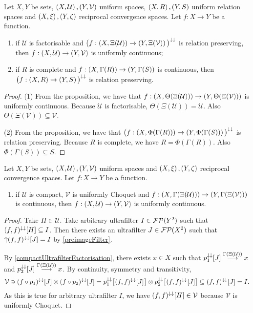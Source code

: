 \begin{corollary}
Let $X,Y$ be sets, $\left( X,\mathcal{U} \right), \left( Y,\mathcal{V} \right)$ uniform spaces, $\left( X,R \right), \left( Y,S \right)$ uniform relation spaces and $\left( X,\xi \right), \left( Y,\zeta \right)$ reciprocal convergence spaces. Let $f: X\to Y$ be a function.
\begin{enumerate}
\item if $\mathcal{U}$ is factorisable and $\big(f: \left( X,\Xi(\mathcal{U}) \right) \to \left( Y,\Xi(\mathcal{V}) \right)\big)^{\downarrow\downarrow}$ is relation preserving, then $f: \left( X,\mathcal{U} \right) \to \left( Y,\mathcal{V} \right)$ is uniformly continuous;
\item if $R$ is complete and $f: \left( X,\Gamma(R) \right) \to \left( Y,\Gamma(S) \right)$ is continuous, then $\big(f: \left( X,R \right) \to \left( Y,S \right)\big)^{\downarrow\downarrow}$ is relation preserving.
\end{enumerate}
\end{corollary}
\begin{proof}
(1) From the proposition, we have that $f: \left( X,\Theta(\Xi(\mathcal{U})) \right) \to \left( Y,\Theta(\Xi(\mathcal{V})) \right)$ is uniformly continuous. Because $\mathcal{U}$ is factorisable, $\Theta(\Xi(\mathcal{U})) = \mathcal{U}$. Also $\Theta(\Xi(\mathcal{V})) \subseteq \mathcal{V}$.

(2) From the proposition, we have that $\big(f: \left( X,\Phi(\Gamma(R)) \right) \to \left( Y,\Phi(\Gamma(S)) \right)\big)^{\downarrow\downarrow}$ is relation preserving. Because $R$ is complete, we have $R = \Phi(\Gamma(R))$. Also $\Phi(\Gamma(S)) \subseteq S$.
\end{proof}

\begin{proposition}
Let $X,Y$ be sets, $\left( X,\mathcal{U} \right), \left( Y,\mathcal{V} \right)$ uniform spaces and $\left( X,\xi \right), \left( Y,\zeta \right)$ reciprocal convergence spaces. Let $f: X\to Y$ be a function.
\begin{enumerate}
\item if $\mathcal{U}$ is compact, $\mathcal{V}$ is uniformly Choquet and $f: \left( X,\Gamma(\Xi(\mathcal{U})) \right) \to \left( Y,\Gamma(\Xi(\mathcal{V})) \right)$ is continuous, then $f: \left( X,\mathcal{U} \right) \to \left( Y,\mathcal{V} \right)$ is uniformly continuous.
\end{enumerate}
\end{proposition}
\begin{proof}
Take $H\in\mathcal{U}$. Take arbitrary ultrafilter $I\in\operatorname{\mathcal{FP}}(Y^2)$ such that $(f,f)^{\downarrow\downarrow}[H]\subseteq I$. Then there exists an ultrafilter $J\in \operatorname{\mathcal{FP}}(X^2)$ such that $\operatorname{\uparrow} (f,f)^{\downarrow\downarrow}[J] = I$ by \ref{preimageFilter}.

By \ref{compactUltrafilterFactorisation}, there exists $x\in X$ such that $p_1^{\downarrow\downarrow}[J]\overset{\Gamma(\Xi(\mathcal{U}))}{\longrightarrow} x$ and $p_2^{\downarrow\downarrow}[J]\overset{\Gamma(\Xi(\mathcal{U}))}{\longrightarrow} x$. By continuity, symmetry and transitivity,
\[ \mathcal{V} \ni (f\circ p_1)^{\downarrow\downarrow}[J]\otimes (f\circ p_2)^{\downarrow\downarrow}[J] = p_1^{\downarrow\downarrow}\big[(f,f)^{\downarrow\downarrow}[J]\big]\otimes p_2^{\downarrow\downarrow}\big[(f,f)^{\downarrow\downarrow}[J]\big] \subseteq (f,f)^{\downarrow\downarrow}[J] = I. \]
As this is true for arbitrary ultrafilter $I$, we have $(f,f)^{\downarrow\downarrow}[H]\in\mathcal{V}$ because $\mathcal{V}$ is uniformly Choquet.
\end{proof}


